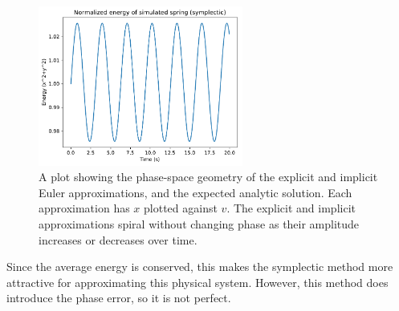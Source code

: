 \documentclass{article}
\begin{document}
\begin{figure}[H]
	\centering
	\includegraphics[width=0.6\textwidth]{eulersymplecticenergy.pdf}
	\caption{A plot showing the phase-space geometry of the explicit and implicit Euler approximations, and the expected analytic solution. Each approximation has $x$ plotted against $v$. The explicit and implicit approximations spiral without changing phase as their amplitude increases or decreases over time.}
	\label{sympenergy}
\end{figure}

Since the average energy is conserved, this makes the symplectic method more attractive for approximating this physical system. However, this method does introduce the phase error, so it is not perfect.
\end{document}
